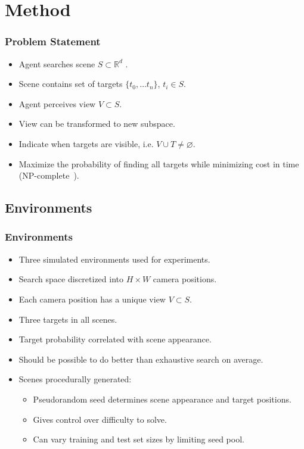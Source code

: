 \section{Method}

\begin{frame}
    \frametitle{Problem Statement}

    \begin{itemize}
        \item Agent searches scene \(S \subset \mathbb{R}^d\) .
        \item Scene contains set of targets \(\{t_0, \dots t_n\}\), \(t_i \in S\).
        \item Agent perceives view \(V \subset S\).
        \item View can be transformed to new subspace.
        \item Indicate when targets are visible, i.e. \(V \cup T \neq \varnothing\). 
        \item Maximize the probability of finding all targets while minimizing cost in time (NP-complete~\cite{andreopoulos_theory_2009}). %
    \end{itemize}
\end{frame}

\subsection{Environments}

\begin{frame}
    \frametitle{Environments}
    
    \begin{itemize}
        \item Three simulated environments used for experiments.
        \item Search space discretized into \(H \times W\) camera positions.
        \item Each camera position has a unique view \(V \subset S\).
        \item Three targets in all scenes.
        \item Target probability correlated with scene appearance.
        \item Should be possible to do better than exhaustive search on average.
        \item Scenes procedurally generated:
        \begin{itemize}
            \item Pseudorandom seed determines scene appearance and target positions.
            \item Gives control over difficulty to solve.
            \item Can vary training and test set sizes by limiting seed pool.
        \end{itemize}
    \end{itemize}
\end{frame}

